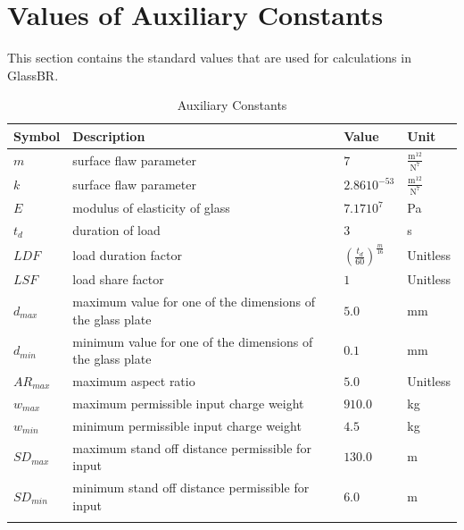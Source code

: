 \documentclass[12pt]{article}
\begin{document}
\section{Values of Auxiliary Constants}
\label{Sec:AuxConstants}
This section contains the standard values that are used for calculations in GlassBR.
\begin{longtabu}{l X[l] l l}
\toprule
Symbol & Description & Value & Unit
\\
\midrule
$m$ & surface flaw parameter & $7$ & $\frac{\text{m}^{12}}{\text{N}^{7}}$
\\
$k$ & surface flaw parameter & $2.86 10^{-53}$ & $\frac{\text{m}^{12}}{\text{N}^{7}}$
\\
$E$ & modulus of elasticity of glass & $7.17 10^{7}$ & Pa
\\
${t_{d}}$ & duration of load & $3$ & s
\\
$LDF$ & load duration factor & $\left(\frac{{t_{d}}}{60}\right)^{\frac{m}{16}}$ & Unitless
\\
$LSF$ & load share factor & $1$ & Unitless
\\
${d_{max}}$ & maximum value for one of the dimensions of the glass plate & $5.0$ & mm
\\
${d_{min}}$ & minimum value for one of the dimensions of the glass plate & $0.1$ & mm
\\
${AR_{max}}$ & maximum aspect ratio & $5.0$ & Unitless
\\
${w_{max}}$ & maximum permissible input charge weight & $910.0$ & kg
\\
${w_{min}}$ & minimum permissible input charge weight & $4.5$ & kg
\\
${SD_{max}}$ & maximum stand off distance permissible for input & $130.0$ & m
\\
${SD_{min}}$ & minimum stand off distance permissible for input & $6.0$ & m
\\
\bottomrule
\caption{Auxiliary Constants}
\label{Table:TAuxConsts}
\end{longtabu}
\end{document}
